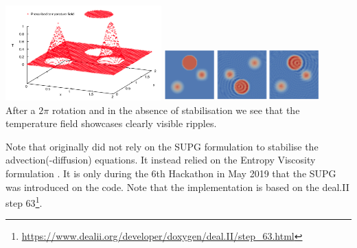 \begin{center}
\includegraphics[width=0.45\textwidth]{images/supg/supg1}
\includegraphics[width=0.45\textwidth]{images/supg/supg2}\\
{\captionfont After a $2\pi$ rotation and in the absence of stabilisation we see that the temperature field
showcases clearly visible ripples.}
\end{center}

\begin{remark}
Note that \aspect{} originally did not rely on the SUPG formulation to stabilise the 
advection(-diffusion) equations\cite{krhb12}. It instead relied on the Entropy Viscosity
formulation \cite{gupp10,gupp11}.
It is only during the 6th Hackathon in May 2019 that the SUPG was introduced on the code.
Note that the \aspect{} implementation is based on the deal.II step 
63\footnote{\url{https://www.dealii.org/developer/doxygen/deal.II/step_63.html}}.
\end{remark}





